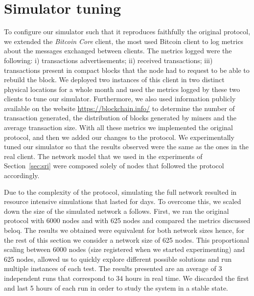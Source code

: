 \section{Simulator tuning}
\label{sec:sim_tuning}
To configure our simulator such that it reproduces faithfully the original protocol, we extended the \textsl{Bitcoin Core} client, the most used Bitcoin client to log metrics about the messages exchanged between clients. The metrics logged were the following: i) transactions advertisements; ii) received transactions; iii) transactions present in compact blocks that the node had to request to be able to rebuild the block. We deployed two instances of this client in two distinct physical locations for a whole month and used the metrics logged by these two clients to tune our simulator. Furthermore, we also used information publicly available on the website \url{https://blockchain.info/} to determine the number of transaction generated, the distribution of blocks generated by miners and the average transaction size. With all these metrics we implemented the original protocol, and then we added our changes to the protocol. We experimentally tuned our simulator so that the results observed were the same as the ones in the real client. The network model that we used in the experiments of Section~\ref{sec:sri} were composed solely of nodes that followed the protocol accordingly.

Due to the complexity of the protocol, simulating the full network resulted in resource intensive simulations that lasted for days.
To overcome this, we scaled down the size of the simulated network a follows.
First,  we ran the original protocol with 6000 nodes and with 625 nodes and compared the metrics discussed beloq. The results we obtained were equivalent for both network sizes hence, for the rest of this section we consider a network size of 625 nodes. This proportional scaling between 6000 nodes (size registered when we started experimenting) and 625 nodes, allowed us to quickly explore different possible solutions and run multiple instances of each test. The results presented are an average of 3 independent runs that correspond to 34 hours in real time. We discarded the first and last 5 hours of each run in order to study the system in a stable state.


